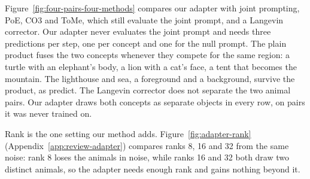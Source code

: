 \documentclass{article} %
\begin{document}
Figure~\ref{fig:four-pairs-four-methods} compares our adapter with joint prompting, PoE, CO3 and ToMe, which still evaluate the joint prompt, and a Langevin corrector. Our adapter never evaluates the joint prompt and needs three predictions per step, one per concept and one for the null prompt. The plain product fuses the two concepts whenever they compete for the same region: a turtle with an elephant's body, a lion with a cat's face, a tent that becomes the mountain. The lighthouse and sea, a foreground and a background, survive the product, as \citet{bradley2025mechanisms} predict. The Langevin corrector does not separate the two animal pairs. Our adapter draws both concepts as separate objects in every row, on pairs it was never trained on.


Rank is the one setting our method adds. Figure~\ref{fig:adapter-rank} (Appendix~\ref{app:review-adapter}) compares ranks 8, 16 and 32 from the same noise: rank 8 loses the animals in noise, while ranks 16 and 32 both draw two distinct animals, so the adapter needs enough rank and gains nothing beyond it.



\end{document}
